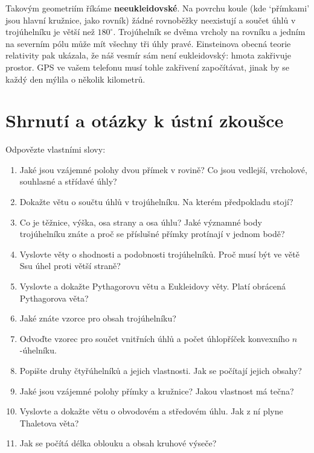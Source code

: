 Takovým geometriím říkáme \textbf{neeukleidovské}. Na povrchu koule (kde `přímkami' jsou hlavní kružnice, jako rovník) žádné rovnoběžky neexistují a součet úhlů v trojúhelníku je větší než $180^\circ$. Trojúhelník se dvěma vrcholy na rovníku a jedním na severním pólu může mít všechny tři úhly pravé. Einsteinova obecná teorie relativity pak ukázala, že náš vesmír sám není eukleidovský: hmota zakřivuje prostor. GPS ve vašem telefonu musí tohle zakřivení započítávat, jinak by se každý den mýlila o několik kilometrů.

\section{Shrnutí a otázky k ústní zkoušce}

\begin{problem}
  Odpovězte vlastními slovy:
  \begin{enumerate}
    \item Jaké jsou vzájemné polohy dvou přímek v rovině? Co jsou vedlejší, vrcholové, souhlasné a střídavé úhly?
    \item Dokažte větu o součtu úhlů v trojúhelníku. Na kterém předpokladu stojí?
    \item Co je těžnice, výška, osa strany a osa úhlu? Jaké významné body trojúhelníku znáte a proč se příslušné přímky protínají v jednom bodě?
    \item Vyslovte věty o shodnosti a podobnosti trojúhelníků. Proč musí být ve větě Ssu úhel proti větší straně?
    \item Vyslovte a dokažte Pythagorovu větu a Eukleidovy věty. Platí obrácená Pythagorova věta?
    \item Jaké znáte vzorce pro obsah trojúhelníku?
    \item Odvoďte vzorec pro součet vnitřních úhlů a počet úhlopříček konvexního $n$-úhelníku.
    \item Popište druhy čtyřúhelníků a jejich vlastnosti. Jak se počítají jejich obsahy?
    \item Jaké jsou vzájemné polohy přímky a kružnice? Jakou vlastnost má tečna?
    \item Vyslovte a dokažte větu o obvodovém a středovém úhlu. Jak z ní plyne Thaletova věta?
    \item Jak se počítá délka oblouku a obsah kruhové výseče?
  \end{enumerate}
\end{problem}
